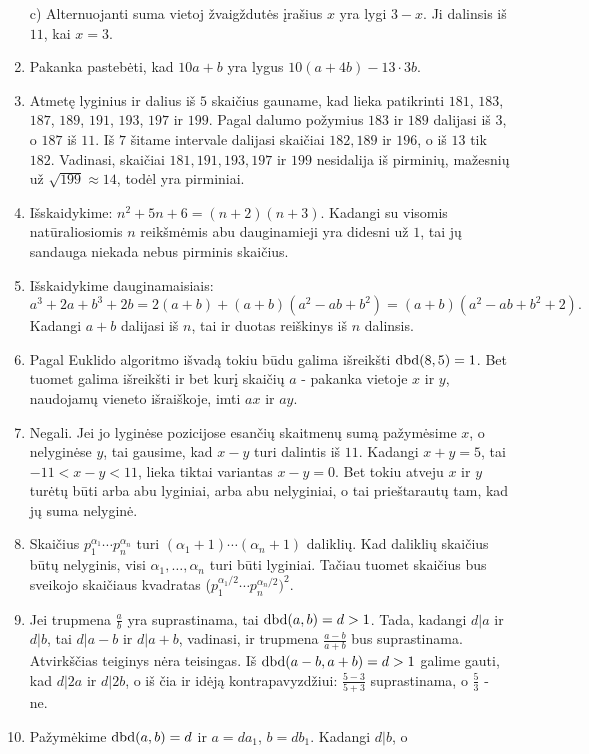 \begin{enumerate}
c) Alternuojanti suma vietoj žvaigždutės įrašius $x$ yra lygi
$3-x$. Ji dalinsis iš $11$, kai $x=3$.
\item 
Pakanka pastebėti, kad $10a+b$ yra lygus $10(a+4b) -13\cdot 3b$.
\item 
Atmetę lyginius ir dalius iš $5$ skaičius gauname, kad lieka
patikrinti $181$, $183$, $187$, $189$, $191$, $193$, $197$ ir $199$. Pagal dalumo
požymius $183$ ir $189$ dalijasi iš $3$, o $187$ iš $11$. Iš
$7$ šitame intervale dalijasi skaičiai $182, 189$ ir $196$, o iš
$13$ tik $182$. Vadinasi, skaičiai $181, 191, 193, 197$ ir $199$
nesidalija iš pirminių, mažesnių už $\sqrt{199} \approx 14$, todėl
yra pirminiai.
\item 
Išskaidykime: $n^2 + 5n + 6 = (n+2)(n+3)$. Kadangi su visomis
natūraliosiomis $n$ reikšmėmis abu dauginamieji yra didesni už
$1$, tai jų sandauga niekada nebus pirminis skaičius.
\item 
Išskaidykime dauginamaisiais: $$a^3 + 2a + b^3 + 2b = 2(a+b) + (a+b)(a^2
-ab + b^2) = (a+b)(a^2 -ab+b^2+2).$$ Kadangi $a+b$ dalijasi iš $n$, tai
ir duotas reiškinys iš $n$ dalinsis.
\item 
Pagal Euklido algoritmo išvadą tokiu būdu galima išreikšti
$\operatorname{dbd}(8,5)=1$. Bet tuomet galima išreikšti ir bet kurį skaičių
$a$ - pakanka vietoje $x$ ir $y$, naudojamų vieneto išraiškoje, imti
$ax$ ir $ay$.
\item 
Negali. Jei jo lyginėse pozicijose esančių skaitmenų sumą pažymėsime
$x$, o nelyginėse $y$, tai gausime, kad $x-y$ turi dalintis iš
$11$. Kadangi $x+y=5$, tai $-11 <x-y< 11$, lieka tiktai variantas
$x-y=0$. Bet tokiu atveju $x$ ir $y$ turėtų būti arba abu lyginiai,
arba abu nelyginiai, o tai prieštarautų tam, kad jų suma nelyginė.
\item 
Skaičius $p_1^{\alpha_1} \cdots p_n^{\alpha_n}$ turi $(\alpha_1 +
1)\cdots(\alpha_n+1)$ daliklių. Kad daliklių skaičius būtų nelyginis,
visi $\alpha_1, \dots ,\alpha_n$ turi būti lyginiai. Tačiau tuomet
skaičius bus sveikojo skaičiaus kvadratas ($p_1^{\alpha_1/2} \cdots
p_n^{\alpha_n/2})^2$.
\item 
Jei trupmena $\frac{a}{b}$ yra suprastinama, tai $\operatorname{dbd}(a,b)=d>1$.
Tada, kadangi $d|a$ ir $d|b$, tai $d|a-b$ ir $d|a+b$, vadinasi, ir
trupmena $\frac{a-b}{a+b}$ bus suprastinama. Atvirkščias teiginys nėra
teisingas. Iš $\operatorname{dbd}(a-b,a+b)=d>1$ galime gauti, kad $d|2a$ ir
$d|2b$, o iš čia ir idėją kontrapavyzdžiui: $\frac{5-3}{5+3}$
suprastinama, o $\frac{5}{3}$ - ne.
\item 
Pažymėkime $\operatorname{dbd}(a,b) = d$ ir $a=da_1$, $b=db_1$. Kadangi $d|b$, o

\end{enumerate}
